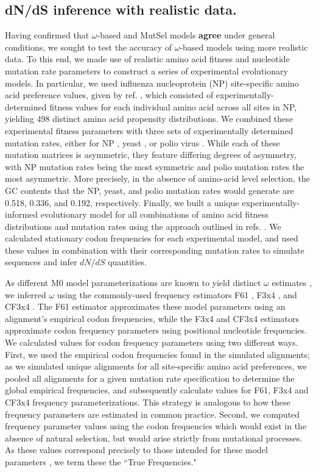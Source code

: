 \documentclass{pnastwo}
\begin{document}
\begin{article}
\subsection*{dN/dS inference with realistic data.}
Having confirmed that $\omega$-based and MutSel models \textbf{agree} under general conditions, we sought to test the accuracy of $\omega$-based models using more realistic data. To this end, we made use of realistic amino acid fitness and nucleotide mutation rate parameters to construct a series of experimental evolutionary models. In particular, we used influenza nucleoprotein (NP) site-specific amino acid preference values, given by ref. \cite{Bloom2014a}, which consisted of experimentally-determined fitness values for each individual amino acid across all sites in NP, yielding 498 distinct amino acid propensity distributions. We combined these experimental fitness parameters with three sets of experimentally determined mutation rates, either for NP \cite{Bloom2014a}, yeast \cite{Zhu2014}, or polio virus \cite{Acevedo2014}. While each of these mutation matrices is asymmetric, they feature differing degrees of asymmetry, with NP mutation rates being the most symmetric and polio mutation rates the most asymmetric. More precisely, in the absence of amino-acid level selection, the GC contents that the NP, yeast, and polio mutation rates would generate are 0.518, 0.336, and 0.192, respectively. Finally, we built a unique experimentally-informed evolutionary model for all combinations of amino acid fitness distributions and mutation rates using the approach outlined in refs. \cite{Bloom2014a,Bloom2014b}. We calculated stationary codon frequencies for each experimental model, and used these values in combination with their corresponding mutation rates to simulate sequences and infer $dN/dS$ quantities. 


As different M0 model parameterizations are known to yield distinct $\omega$ estimates \cite{ZhangYu2006,Yang2006}, we inferred $\omega$ using the commonly-used frequency estimators F61 \cite{GoldmanYang1994}, F3x4 \cite{MuseGaut1994}, and CF3x4 \cite{Pond2010}. The F61 estimator approximates these model parameters using an alignment's empirical codon frequencies, while the F3x4 and CF3x4 estimators approximate codon frequency parameters using positional nucleotide frequencies. We calculated values for codon frequency parameters using two different ways. First, we used the empirical codon frequencies found in the simulated alignments; as we simulated unique alignments for all site-specific amino acid preferences, we pooled all alignments for a given mutation rate specification to determine the global empirical frequencies, and subsequently calculate values for F61, F3x4 and CF3x4 frequency parameterizations. This strategy is analogous to how these frequency parameters are estimated in common practice. Second, we computed frequency parameter values using the codon frequencies which would exist in the absence of natural selection, but would arise strictly from mutational processes. As these values correspond precisely to those intended for these model parameters \cite{GoldmanYang1994,MuseGaut1994,YN00,Yang2006}, we term these the ``True Frequencies."


\end{article}
\end{document}
